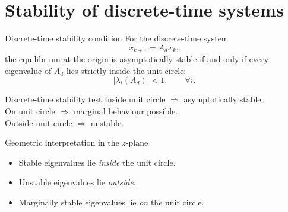 \documentclass[aspectratio=169,10pt]{beamer}
\begin{document}
\section{Stability of discrete-time systems}

\begin{frame}{Discrete-time stability condition}
For the discrete-time system
\[
x_{k+1}=A_d x_k,
\]
the equilibrium at the origin is asymptotically stable if and only if every eigenvalue of \(A_d\) lies strictly inside the unit circle:
\[
|\lambda_i(A_d)|<1,\qquad \forall i.
\]

\begin{alertbox}{Discrete-time stability test}
Inside unit circle \(\Rightarrow\) asymptotically stable. \\
On unit circle \(\Rightarrow\) marginal behaviour possible. \\
Outside unit circle \(\Rightarrow\) unstable.
\end{alertbox}
\end{frame}

\begin{frame}{Geometric interpretation in the \(z\)-plane}
\begin{itemize}
  \item Stable eigenvalues lie \emph{inside} the unit circle.
  \item Unstable eigenvalues lie \emph{outside}.
  \item Marginally stable eigenvalues lie \emph{on} the unit circle.
\end{itemize}

\begin{center}
\end{center}
\end{frame}
\end{document}
